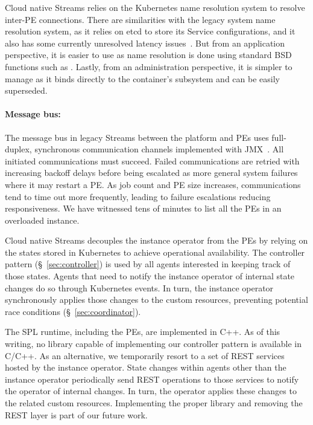 Cloud native Streams relies on the Kubernetes name resolution system to resolve
inter-PE connections. There are similarities with the legacy system name
resolution system, as it relies on etcd to store its Service configurations, and
it also has some currently unresolved latency issues~\cite{codacydns,machudns}.
But from an application perspective, it is easier to use as name resolution is
done using standard BSD functions such as . Lastly, from
an administration perspective, it is simpler to manage as it binds directly to
the container's  subsystem and can be easily superseded.

\paragraph{Message bus:} The message bus in legacy Streams between the platform
and PEs uses full-duplex, synchronous communication channels implemented with
JMX~\cite{jmx}. All initiated communications must succeed. Failed
communications are retried with increasing backoff delays before being
escalated as more general system failures where it may restart a PE. As job
count and PE size increases, communications tend to time out more frequently,
leading to failure escalations reducing responsiveness. We have witnessed tens
of minutes to list all the PEs in an overloaded instance.

Cloud native Streams decouples the instance operator from the PEs by relying on
the states stored in Kubernetes to achieve operational availability. The
controller pattern (\S~\ref{sec:controller}) is used by all agents
interested in keeping track of those states. Agents that need to notify the
instance operator of internal state changes do so through Kubernetes events.  In
turn, the instance operator synchronously applies those changes to the custom
resources, preventing potential race conditions (\S~\ref{sec:coordinator}).

The SPL runtime, including the PEs, are implemented in C++. As of this writing,
no library capable of implementing our controller pattern is available in C/C++.
As an alternative, we temporarily resort to a set of REST services hosted by the
instance operator. State changes within agents other than the instance operator
periodically send REST operations to those services to notify the operator of
internal changes. In turn, the operator applies these changes to the related
custom resources. Implementing the proper library and removing the REST layer is
part of our future work.

